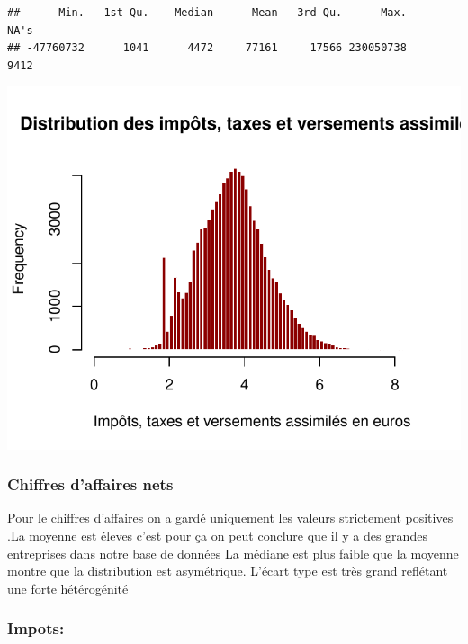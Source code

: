 \documentclass[mstat,12pt]{unswthesis}
\begin{document}
\medskip

\begin{verbatim}
##      Min.   1st Qu.    Median      Mean   3rd Qu.      Max.      NA's 
## -47760732      1041      4472     77161     17566 230050738      9412
\end{verbatim}

\includegraphics{TDDT_projet_L_2_files/figure-latex/unnamed-chunk-33-1.pdf}

\medskip

\subsubsection{Chiffres d'affaires nets}\label{chiffres-daffaires-nets}

\medskip

Pour le chiffres d'affaires on a gardé uniquement les valeurs
strictement positives .La moyenne est éleves c'est pour ça on peut
conclure que il y a des grandes entreprises dans notre base de données
La médiane est plus faible que la moyenne montre que la distribution est
asymétrique. L'écart type est très grand reflétant une forte
hétérogénité

\medskip

\subsubsection{Impots:}\label{impots}

\medskip

\scriptsize
\end{document}
